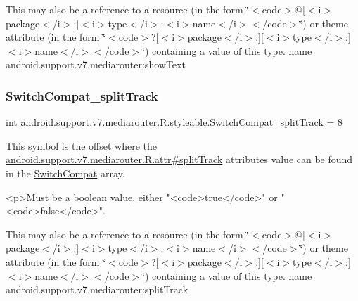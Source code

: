 This may also be a reference to a resource (in the form \char`\"{}$<$code$>$@\mbox{[}$<$i$>$package$<$/i$>$\+:\mbox{]}$<$i$>$type$<$/i$>$\+:$<$i$>$name$<$/i$>$$<$/code$>$\char`\"{}) or theme attribute (in the form \char`\"{}$<$code$>$?\mbox{[}$<$i$>$package$<$/i$>$\+:\mbox{]}\mbox{[}$<$i$>$type$<$/i$>$\+:\mbox{]}$<$i$>$name$<$/i$>$$<$/code$>$\char`\"{}) containing a value of this type.  name android.\+support.\+v7.\+mediarouter\+:show\+Text \mbox{\label{classandroid_1_1support_1_1v7_1_1mediarouter_1_1R_1_1styleable_a318ab94a649fd9ebfa42612d0c77726c}} 
\subsubsection{\texorpdfstring{Switch\+Compat\+\_\+split\+Track}{SwitchCompat\_splitTrack}}
{\footnotesize\ttfamily int android.\+support.\+v7.\+mediarouter.\+R.\+styleable.\+Switch\+Compat\+\_\+split\+Track = 8\hspace{0.3cm}{\ttfamily [static]}}

This symbol is the offset where the \hyperlink{classandroid_1_1support_1_1v7_1_1mediarouter_1_1R_1_1attr_aa03b4010fc09e6f0eefb355dd934ba9c}{android.\+support.\+v7.\+mediarouter.\+R.\+attr\#split\+Track} attribute\textquotesingle{}s value can be found in the \hyperlink{classandroid_1_1support_1_1v7_1_1mediarouter_1_1R_1_1styleable_af5c7f83276b6c88619833dc8bebeacd9}{Switch\+Compat} array.

\begin{DoxyVerb}      <p>Must be a boolean value, either "<code>true</code>" or "<code>false</code>".
\end{DoxyVerb}
 

This may also be a reference to a resource (in the form \char`\"{}$<$code$>$@\mbox{[}$<$i$>$package$<$/i$>$\+:\mbox{]}$<$i$>$type$<$/i$>$\+:$<$i$>$name$<$/i$>$$<$/code$>$\char`\"{}) or theme attribute (in the form \char`\"{}$<$code$>$?\mbox{[}$<$i$>$package$<$/i$>$\+:\mbox{]}\mbox{[}$<$i$>$type$<$/i$>$\+:\mbox{]}$<$i$>$name$<$/i$>$$<$/code$>$\char`\"{}) containing a value of this type.  name android.\+support.\+v7.\+mediarouter\+:split\+Track \mbox{\label{classandroid_1_1support_1_1v7_1_1mediarouter_1_1R_1_1styleable_a352987fa61ad38cf9d576099efe2ad26}} 
